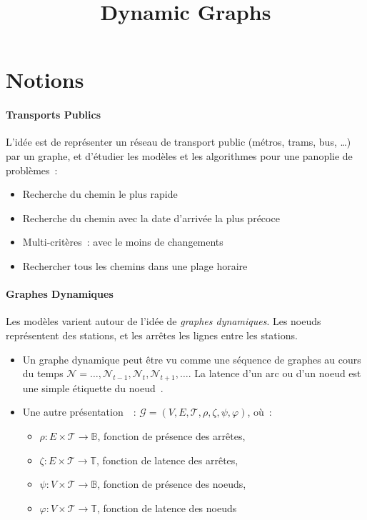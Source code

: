 \documentclass[11pt,a4paper]{article}
\title{Dynamic Graphs}
\begin{document}
\section{Notions}

\paragraph{Transports Publics}
L'idée est de représenter un réseau de transport public (métros,
trams, bus, …) par un graphe, et d'étudier les modèles et les
algorithmes pour une panoplie de problèmes~:
\begin{itemize}
\item Recherche du chemin le plus rapide
\item Recherche du chemin avec la date d'arrivée la plus précoce
\item Multi-critères~: avec le moins de changements
\item Rechercher tous les chemins dans une plage horaire
\end{itemize}


\paragraph{Graphes Dynamiques}
Les modèles varient autour de l'idée de \textit{graphes
  dynamiques}. Les noeuds représentent des stations, et les arrêtes
les lignes entre les stations.

\begin{itemize}
\item Un graphe dynamique peut être vu comme une séquence de graphes
  au cours du temps \(\mathcal{N} = \dots, \mathcal{N}_{t-1},
  \mathcal{N}_{t}, \mathcal{N}_{t+1}, \dots\). La latence d'un arc ou
  d'un noeud est une simple étiquette du noeud~\cite{xuan2003computing}.
\item Une autre présentation~\cite{casteigts2012time}~:
  \(\mathcal{G} = (V, E, \mathcal{T}, \rho, \zeta, \psi, \varphi)\),
  où~:
  \begin{itemize}
  \item \(\rho : E \times \mathcal{T} \to \mathbb{B}\), fonction de
    présence des arrêtes,
  \item \(\zeta : E \times \mathcal{T} \to \mathbb{T}\), fonction de
    latence des arrêtes,
  \item \(\psi : V \times \mathcal{T} \to \mathbb{B}\), fonction de
    présence des noeuds,
  \item \(\varphi : V \times \mathcal{T} \to \mathbb{T}\), fonction de
    latence des noeuds
  \end{itemize}
\end{itemize}
\end{document}
